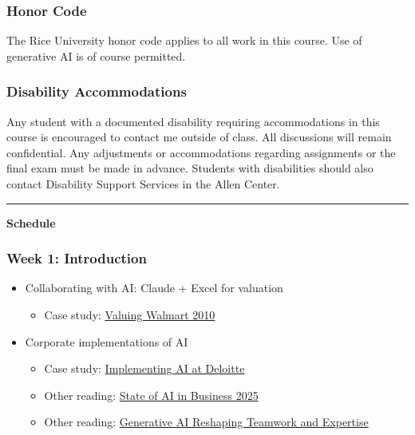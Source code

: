 \documentclass[11pt]{article}
\begin{document}
\subsubsection*{Honor Code}
The Rice University honor code applies to all work in this course. Use of generative AI is of course permitted.

\subsubsection*{Disability Accommodations}
Any student with a documented disability requiring accommodations in this course is encouraged to contact me outside of class. All discussions will remain confidential. Any adjustments or accommodations regarding assignments or the final exam must be made in advance. Students with disabilities should also contact Disability Support Services in the Allen Center.

\vspace{1cm}
\hrule
\vspace{0.5cm}

\begin{center}
\textbf{\Large  Schedule}
\end{center}

\subsubsection*{Week 1: Introduction}
\begin{itemize}\setlength{\itemsep}{0pt}
\item Collaborating with AI: Claude + Excel for valuation
\begin{itemize}
\item Case study: \href{https://hbsp.harvard.edu/product/W11058-PDF-ENG}{Valuing Walmart 2010}
\end{itemize}
\item Corporate implementations of AI
\begin{itemize}

\item Case study: \href{https://hbsp.harvard.edu/product/HEC382-PDF-ENG}{Implementing AI at Deloitte}
\item Other reading: 
\href{https://mlq.ai/media/quarterly_decks/v0.1_State_of_AI_in_Business_2025_Report.pdf}{State of AI in Business 2025}
\item
Other reading: \href{https://papers.ssrn.com/sol3/papers.cfm?abstract_id=5188231}{Generative AI Reshaping Teamwork and Expertise}
\end{itemize}
\end{itemize}
\end{document}
